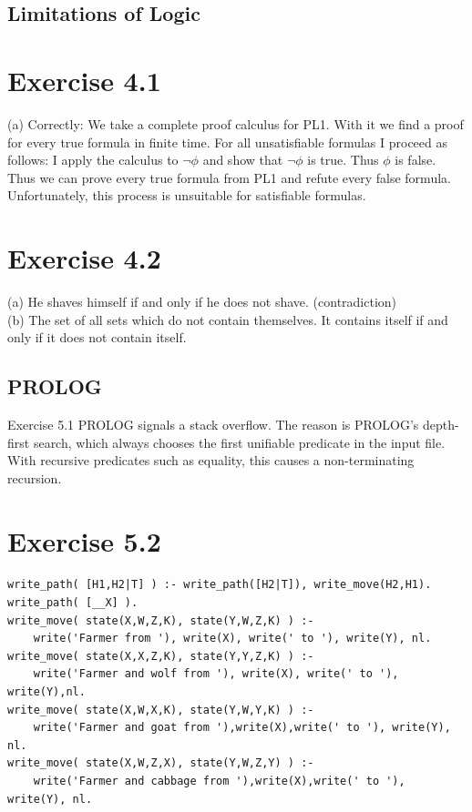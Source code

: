 \documentclass[10pt]{book}
\begin{document}
\subsection*{Limitations of Logic}
\section*{Exercise 4.1}
(a) Correctly: We take a complete proof calculus for PL1. With it we find a proof for every true formula in finite time. For all unsatisfiable formulas I proceed as follows: I apply the calculus to $\neg \phi$ and show that $\neg \phi$ is true. Thus $\phi$ is false. Thus we can prove every true formula from PL1 and refute every false formula. Unfortunately, this process is unsuitable for satisfiable formulas.

\section*{Exercise 4.2}
(a) He shaves himself if and only if he does not shave. (contradiction)\\
(b) The set of all sets which do not contain themselves. It contains itself if and only if it does not contain itself.

\subsection*{PROLOG}
Exercise 5.1 PROLOG signals a stack overflow. The reason is PROLOG's depth-first search, which always chooses the first unifiable predicate in the input file. With recursive predicates such as equality, this causes a non-terminating recursion.

\section*{Exercise 5.2}
\begin{verbatim}
write_path( [H1,H2|T] ) :- write_path([H2|T]), write_move(H2,H1).
write_path( [__X] ).
write_move( state(X,W,Z,K), state(Y,W,Z,K) ) :-
    write('Farmer from '), write(X), write(' to '), write(Y), nl.
write_move( state(X,X,Z,K), state(Y,Y,Z,K) ) :-
    write('Farmer and wolf from '), write(X), write(' to '), write(Y),nl.
write_move( state(X,W,X,K), state(Y,W,Y,K) ) :-
    write('Farmer and goat from '),write(X),write(' to '), write(Y), nl.
write_move( state(X,W,Z,X), state(Y,W,Z,Y) ) :-
    write('Farmer and cabbage from '),write(X),write(' to '), write(Y), nl.
\end{verbatim}
\end{document}
